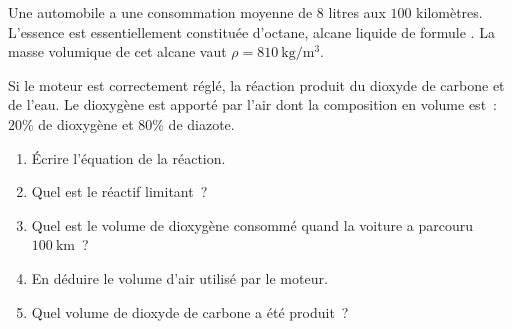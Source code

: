 Une automobile a une consommation moyenne de $8$ litres aux $100$ kilomètres.
L'essence est essentiellement constituée d'octane, alcane liquide de formule
. La masse volumique de cet alcane vaut
$\rho=\qty{810}{\kg\per\cubic\m}$.

Si le moteur est correctement réglé, la réaction produit du dioxyde de carbone
et de l'eau. Le dioxygène est apporté par l'air dont la composition en volume
est~: $20 \%$ de dioxygène et $80 \%$ de diazote.
\begin{enumerate}
    \item Écrire l'équation de la réaction.
    \item Quel est le réactif limitant~?
    \item Quel est le volume de dioxygène consommé quand la voiture a parcouru
          $\qty{100}{\km}$~?
    \item En déduire le volume d'air utilisé par le moteur.
    \item Quel volume de dioxyde de carbone a été produit~?
\end{enumerate}

